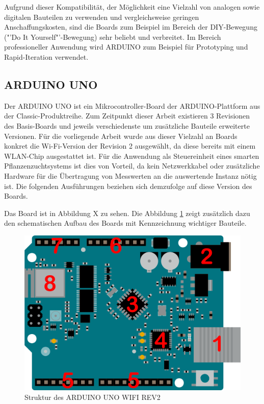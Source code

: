\documentclass[
    load-dhbw-templates,
    load-preamble = true,
    auto-intro-pages = all,
    add-tocs-to-toc,
    debug = true,
    language = english,
    mainlanguage = ngerman,
    add-bibliography,
    bib-file = dhbw-source.bib,
    biblatex/style = numeric,
    print- = false
]{iodhbwm}
\begin{document}
        Aufgrund dieser Kompatibilität, der Möglichkeit eine Vielzahl von analogen sowie digitalen Bauteilen zu verwenden und vergleichsweise geringen Anschaffungskosten, sind die Boards zum Beispiel im Bereich der DIY-Bewegung ("'Do It Yourself"'-Bewegung) sehr beliebt und verbreitet.
        Im Bereich professioneller Anwendung wird ARDUINO zum Beispiel für Prototyping und Rapid-Iteration verwendet.%


        \subsection{ARDUINO UNO}


        Der ARDUINO UNO ist ein Mikrocontroller-Board der ARDUINO-Plattform aus der Classic-Produktreihe. Zum Zeitpunkt dieser Arbeit existieren 3 Revisionen des Basis-Boards und jeweils verschiedenste um zusätzliche Bauteile erweiterte Versionen. Für die vorliegende Arbeit wurde aus dieser Vielzahl an Boards konkret die Wi-Fi-Version der Revision 2 ausgewählt, da diese bereits mit einem WLAN-Chip ausgestattet ist. Für die Anwendung als Steuereinheit eines smarten Pflanzenzuchtsystems ist dies von Vorteil, da kein Netzwerkkabel oder zusätzliche Hardware für die Übertragung von Messwerten an die auswertende Instanz nötig ist.
        Die folgenden Ausführungen beziehen sich demzufolge auf diese Version des Boards.

        Das Board ist in Abbildung X zu sehen.%
        Die Abbildung \ref{fig:ARDUINOUNOSketch} zeigt zusätzlich dazu den schematischen Aufbau des Boards mit Kennzeichnung wichtiger Bauteile.
       

        \begin{figure}[H]
            \centering
            \includegraphics[scale=0.25]{../Quellenangaben/Dokumente/ARDUINO UNO REV2 Dokumentation/unorev2_edited.png}
            \caption[ARDUINOUNOSketch]{Struktur des ARDUINO UNO WIFI REV2 \footnotemark}
            \label{fig:ARDUINOUNOSketch} 
        \end{figure}
            
\end{document}
